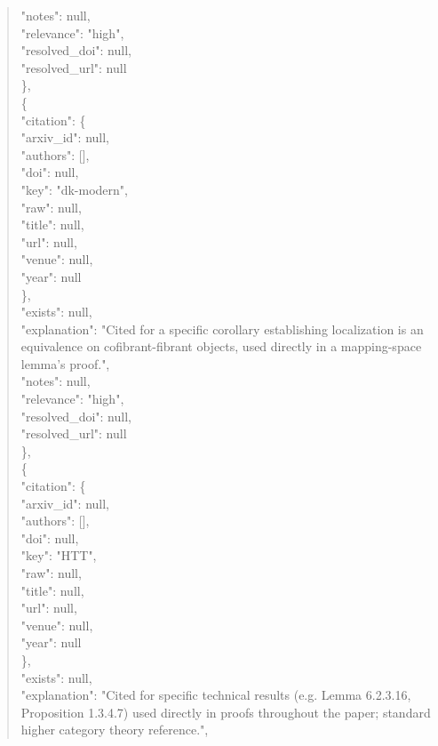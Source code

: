 \documentclass[11pt]{article}
\begin{document}
\begin{quote}
      "notes": null,\\
      "relevance": "high",\\
      "resolved\_doi": null,\\
      "resolved\_url": null\\
    \},\\
    \{\\
      "citation": \{\\
        "arxiv\_id": null,\\
        "authors": [],\\
        "doi": null,\\
        "key": "dk-modern",\\
        "raw": null,\\
        "title": null,\\
        "url": null,\\
        "venue": null,\\
        "year": null\\
      \},\\
      "exists": null,\\
      "explanation": "Cited for a specific corollary establishing localization is an equivalence on cofibrant-fibrant objects, used directly in a mapping-space lemma's proof.",\\
      "notes": null,\\
      "relevance": "high",\\
      "resolved\_doi": null,\\
      "resolved\_url": null\\
    \},\\
    \{\\
      "citation": \{\\
        "arxiv\_id": null,\\
        "authors": [],\\
        "doi": null,\\
        "key": "HTT",\\
        "raw": null,\\
        "title": null,\\
        "url": null,\\
        "venue": null,\\
        "year": null\\
      \},\\
      "exists": null,\\
      "explanation": "Cited for specific technical results (e.g. Lemma 6.2.3.16, Proposition 1.3.4.7) used directly in proofs throughout the paper; standard higher category theory reference.",\\

\end{quote}
\end{document}
